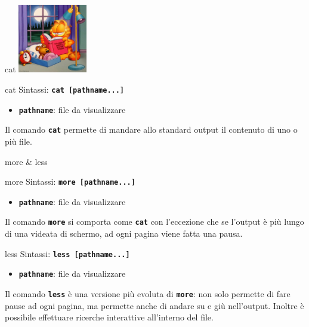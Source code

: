 \documentclass{beamer}
\begin{document}
    \begin{frame}{cat}
        \centering
        \includegraphics[height=3cm, keepaspectratio]{images/garfield.jpg}

        \begin{block}{cat}
            Sintassi: \texttt{\textbf{cat [pathname...]}}

            \begin{itemize}
                \item \texttt{\textbf{pathname}}: file da visualizzare
            \end{itemize}

            Il comando \texttt{\textbf{cat}} permette di mandare allo standard output il contenuto di uno o più file.
        \end{block}
    \end{frame}

    \begin{frame}{more \& less}
        \begin{block}{more}
            Sintassi: \texttt{\textbf{more [pathname...]}}

            \begin{itemize}
                \item \texttt{\textbf{pathname}}: file da visualizzare
            \end{itemize}

            Il comando \texttt{\textbf{more}} si comporta come \texttt{\textbf{cat}} con
            l'eccezione che se l'output è più lungo di una videata di schermo, ad ogni pagina viene fatta una pausa.
        \end{block}

        \begin{block}{less}
            Sintassi: \texttt{\textbf{less [pathname...]}}

            \begin{itemize}
                \item \texttt{\textbf{pathname}}: file da visualizzare
            \end{itemize}

            Il comando \texttt{\textbf{less}} è una versione più evoluta di \texttt{\textbf{more}}: non solo permette di
            fare pause ad ogni pagina, ma permette anche di andare su e giù
            nell’output. Inoltre è possibile effettuare ricerche interattive
            all’interno del file.
        \end{block}
    \end{frame}
\end{document}

